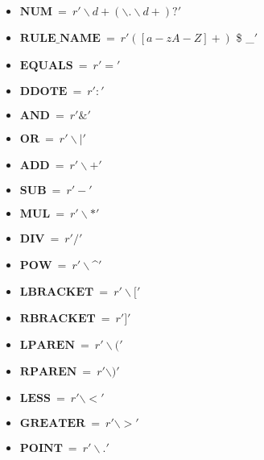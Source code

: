 \begin{itemize}
 \item []$\mathbf{NUM}\ =\ r'\backslash d+(\backslash .\backslash d+)?'$
 
 \item []$\mathbf{RULE\_NAME}\ =\ r'([a-zA-Z]+) $\textbar $ $ \$ $ $\textbar \_$ '$
 \item []$\mathbf{EQUALS}\ =\ r'='$
 \item []$\mathbf{DDOTE}\ =\ r':'$
 \item []$\mathbf{AND}\ =\ r'\&'$ 
 \item []$\mathbf{OR}\ =\ r'\backslash|'$  
 \item []$\mathbf{ADD}\ =\ r'\backslash+'$
 \item []$\mathbf{SUB}\ =\ r'-'$
 \item []$\mathbf{MUL}\ =\ r'\backslash*'$
 \item []$\mathbf{DIV}\ =\ r'/'$
 \item []$\mathbf{POW}\ =\ r'\backslash$\textasciicircum $'$
 \item []$\mathbf{LBRACKET}\ =\ r'\backslash['$
 \item []$\mathbf{RBRACKET}\ =\ r']'$
 \item []$\mathbf{LPAREN}\ =\ r'\backslash('$
 \item []$\mathbf{RPAREN}\ =\ r'\backslash)'$
 \item []$\mathbf{LESS}\ =\ r'\backslash<'$
 \item []$\mathbf{GREATER}\ =\ r'\backslash>'$
 \item []$\mathbf{POINT}\ =\ r'\backslash.'$
\end{itemize}

